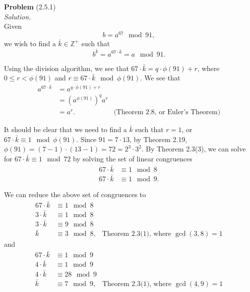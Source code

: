 \documentclass[12 pt]{amsart}
\begin{document}
\phantom{\quad} \vfill
\noindent
\textbf{Problem} (2.5.1) \\[4ex]
\emph{Solution.} \\[2ex]
  Given 
  \[
    b = a^{67} \mod 91,
  \]
  we wish to find a $\bar{k} \in \mathbb{Z}^+$ such that
  \[
    b^{\bar{k}} = a^{67 \cdot \bar{k}} = a \mod 91.
  \]

  Using the division algorithm, 
  we see that $67\cdot \bar{k} = q \cdot \phi(91) + r$, where
  $0 \leq r < \phi(91)$ and $r \equiv 67 \cdot \bar{k} \mod \phi(91)$.
  We see that
  \begin{align*}
    a^{67 \cdot \bar{k}} 
    &=
      a^{q \cdot \phi(91) + r}  \\
    &=
      \left( a^{\phi(91)} \right)^q a^r \\
    &=
      a^r. & \text{(Theorem 2.8, or Euler's Theorem)}
  \end{align*}
  
  It should be clear that we need to find a $\bar{k}$ such that $r = 1$,
  or $67 \cdot \bar{k} \equiv 1 \mod \phi(91)$.
  Since $91 = 7 \cdot 13$, 
  by Theorem 2.19,
  $\phi(91) = (7-1) \cdot (13 - 1) = 72 = 2^3 \cdot 3^2$.
  By Theorem 2.3(3), we can solve for 
  $67 \cdot \bar{k} \equiv 1 \mod 72$ by solving the set of linear 
  congruences
  \begin{align*}
    67 \cdot \bar{k} &\equiv 1 \mod 8 \\
    67 \cdot \bar{k} &\equiv 1 \mod 9. 
  \end{align*}

  We can reduce the above set of congruences to
  \begin{align*}
    67 \cdot \bar{k} &\equiv 1 \mod 8 \\
    3 \cdot \bar{k} &\equiv 1 \mod 8 \\
    3 \cdot \bar{k} &\equiv 9 \mod 8 \\
    \bar{k} &\equiv 3 \mod 8, & \text{Theorem 2.3(1), where $\gcd(3,8) = 1$}
  \end{align*}
  and
  \begin{align*}
    67 \cdot \bar{k} &\equiv 1 \mod 9 \\
    4 \cdot \bar{k} &\equiv 1 \mod 9 \\
    4 \cdot \bar{k} &\equiv 28 \mod 9 \\
    \bar{k} &\equiv 7 \mod 9, & \text{Theorem 2.3(1), where $\gcd(4,9) = 1$}
  \end{align*}
  
\end{document}
